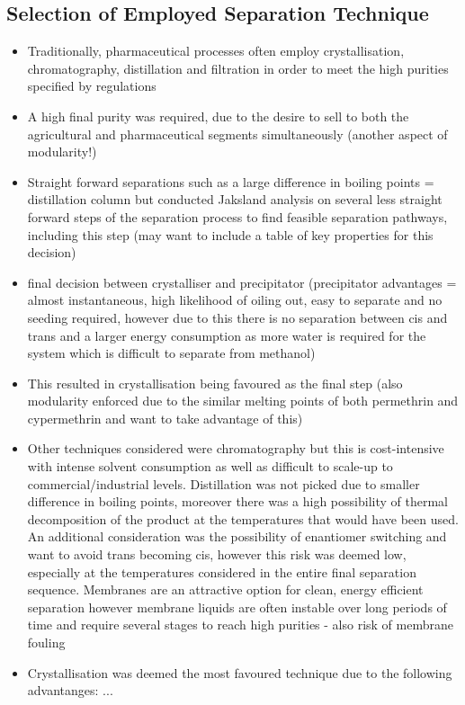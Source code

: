 \subsection{Selection of Employed Separation Technique}
\begin{itemize}
    \item Traditionally, pharmaceutical processes often employ crystallisation, chromatography, distillation and filtration in order to meet the high purities specified by regulations
    \item A high final purity was required, due to the desire to sell to both the agricultural and pharmaceutical segments simultaneously (another aspect of modularity!) 
    \item Straight forward separations such as a large difference in boiling points = distillation column but conducted Jaksland analysis on several less straight forward steps of the separation process to find feasible separation pathways, including this step (may want to include a table of key properties for this decision)
    \item final decision between crystalliser and precipitator (precipitator advantages = almost instantaneous, high likelihood of oiling out, easy to separate and no seeding required, however due to this there is no separation between cis and trans and a larger energy consumption as more water is required for the system which is difficult to separate from methanol) 
    \item This resulted in crystallisation being favoured as the final step (also modularity enforced due to the similar melting points of both permethrin and cypermethrin and want to take advantage of this)
    \item Other techniques considered were chromatography but this is cost-intensive with intense solvent consumption as well as difficult to scale-up to commercial/industrial levels. Distillation was not picked due to smaller difference in boiling points, moreover there was a high possibility of thermal decomposition of the product at the temperatures that would have been used. An additional consideration was the possibility of enantiomer switching and want to avoid trans becoming cis, however this risk was deemed low, especially at the temperatures considered in the entire final separation sequence. Membranes are an attractive option for clean, energy efficient separation however membrane liquids are often instable over long periods of time and require several stages to reach high purities - also risk of membrane fouling
   \item Crystallisation was deemed the most favoured technique due to the following advantanges: ... 
\end{itemize}


